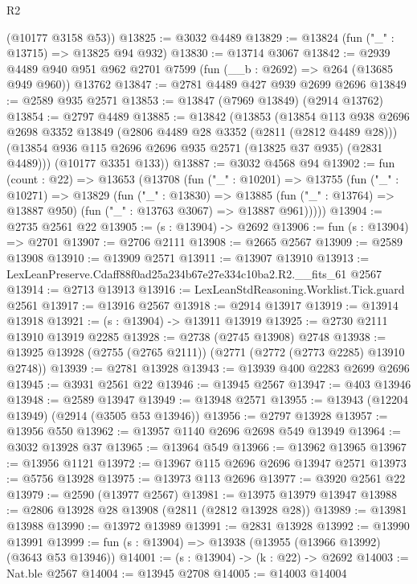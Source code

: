 \begin{lexlean}{R2}
\begin{coremodule}
      (@10177 @3158 @53))
@13825 := @3032 @4489
@13829 := @13824 (fun ("_" : @13715) => @13825 @94 @932)
@13830 := @13714 @3067
@13842 := @2939
    @4489
    @940
    @951
    @962
    @2701
    @7599
    (fun (__b : @2692) => @264 (@13685 @949 @960))
    @13762
@13847 := @2781 @4489 @427 @939 @2699 @2696
@13849 := @2589 @935 @2571
@13853 := @13847 (@7969 @13849) (@2914 @13762)
@13854 := @2797 @4489
@13885 := @13842
    (@13853
      (@13854
        @113
        @938
        @2696
        @2698
        @3352
        @13849
        (@2806 @4489 @28 @3352 (@2811 (@2812 @4489 @28)))
        (@13854 @936 @115 @2696 @2696 @935 @2571 (@13825 @37 @935) (@2831 @4489)))
      (@10177 @3351 @133))
@13887 := @3032 @4568 @94
@13902 := fun (count : @22) =>
  @13653
    (@13708
      (fun ("_" : @10201) =>
      @13755
        (fun ("_" : @10271) =>
        @13829
          (fun ("_" : @13830) =>
          @13885 (fun ("_" : @13764) => @13887 @950) (fun ("_" : @13763 @3067) => @13887 @961)))))
@13904 := @2735 @2561 @22
@13905 := (s : @13904) -> @2692
@13906 := fun (s : @13904) => @2701
@13907 := @2706 @2111
@13908 := @2665 @2567
@13909 := @2589 @13908
@13910 := @13909 @2571
@13911 := @13907 @13910
@13913 := LexLeanPreserve.Cdaff88f0ad25a234b67e27e334c10ba2.R2.__fits_61 @2567
@13914 := @2713 @13913
@13916 := LexLeanStdReasoning.Worklist.Tick.guard @2561
@13917 := @13916 @2567
@13918 := @2914 @13917
@13919 := @13914 @13918
@13921 := (s : @13904) -> @13911 @13919
@13925 := @2730 @2111 @13910 @13919 @2285
@13928 := @2738 (@2745 @13908) @2748
@13938 := @13925 @13928 (@2755 (@2765 @2111)) (@2771 (@2772 (@2773 @2285) @13910 @2748))
@13939 := @2781 @13928
@13943 := @13939 @400 @2283 @2699 @2696
@13945 := @3931 @2561 @22
@13946 := @13945 @2567
@13947 := @403 @13946
@13948 := @2589 @13947
@13949 := @13948 @2571
@13955 := @13943 (@12204 @13949) (@2914 (@3505 @53 @13946))
@13956 := @2797 @13928
@13957 := @13956 @550
@13962 := @13957 @1140 @2696 @2698 @549 @13949
@13964 := @3032 @13928 @37
@13965 := @13964 @549
@13966 := @13962 @13965
@13967 := @13956 @1121
@13972 := @13967 @115 @2696 @2696 @13947 @2571
@13973 := @5756 @13928
@13975 := @13973 @113 @2696
@13977 := @3920 @2561 @22
@13979 := @2590 (@13977 @2567)
@13981 := @13975 @13979 @13947
@13988 := @2806 @13928 @28 @13908 (@2811 (@2812 @13928 @28))
@13989 := @13981 @13988
@13990 := @13972 @13989
@13991 := @2831 @13928
@13992 := @13990 @13991
@13999 := fun (s : @13904) => @13938 (@13955 (@13966 @13992) (@3643 @53 @13946))
@14001 := (s : @13904) -> (k : @22) -> @2692
@14003 := Nat.ble @2567
@14004 := @13945 @2708
@14005 := @14003 @14004

\end{coremodule}
\end{lexlean}
